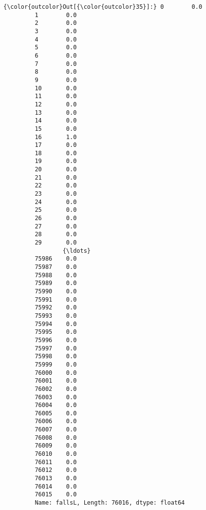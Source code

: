 \documentclass[11pt]{article}
\begin{document}
\begin{Verbatim}[commandchars=\\\{\}]
{\color{outcolor}Out[{\color{outcolor}35}]:} 0        0.0
         1        0.0
         2        0.0
         3        0.0
         4        0.0
         5        0.0
         6        0.0
         7        0.0
         8        0.0
         9        0.0
         10       0.0
         11       0.0
         12       0.0
         13       0.0
         14       0.0
         15       0.0
         16       1.0
         17       0.0
         18       0.0
         19       0.0
         20       0.0
         21       0.0
         22       0.0
         23       0.0
         24       0.0
         25       0.0
         26       0.0
         27       0.0
         28       0.0
         29       0.0
                 {\ldots} 
         75986    0.0
         75987    0.0
         75988    0.0
         75989    0.0
         75990    0.0
         75991    0.0
         75992    0.0
         75993    0.0
         75994    0.0
         75995    0.0
         75996    0.0
         75997    0.0
         75998    0.0
         75999    0.0
         76000    0.0
         76001    0.0
         76002    0.0
         76003    0.0
         76004    0.0
         76005    0.0
         76006    0.0
         76007    0.0
         76008    0.0
         76009    0.0
         76010    0.0
         76011    0.0
         76012    0.0
         76013    0.0
         76014    0.0
         76015    0.0
         Name: fallsL, Length: 76016, dtype: float64
\end{Verbatim}
            
\end{document}
